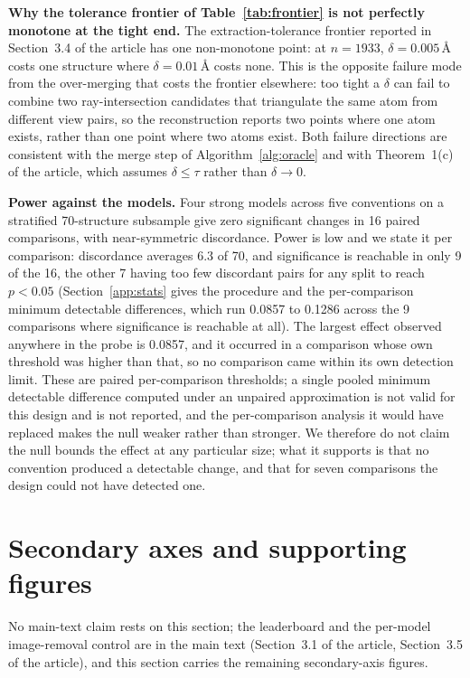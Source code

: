 \textbf{Why the tolerance frontier of Table~\ref{tab:frontier} is not perfectly monotone at the tight end.}
The extraction-tolerance frontier reported in Section~3.4 of the article has one non-monotone point: at
$n=1933$, $\delta = 0.005$\,\AA{} costs one structure where $\delta = 0.01$\,\AA{} costs none. This is the
opposite failure mode from the over-merging that costs the frontier elsewhere: too tight a $\delta$ can fail
to combine two ray-intersection candidates that triangulate the same atom from different view pairs, so the
reconstruction reports two points where one atom exists, rather than one point where two atoms exist. Both
failure directions are consistent with the merge step of Algorithm~\ref{alg:oracle} and with
Theorem~1(c) of the article, which assumes $\delta \le \tau$ rather than $\delta \to 0$.

\textbf{Power against the models.} Four strong models across five conventions on a stratified 70-structure
subsample give zero significant changes in 16 paired comparisons, with near-symmetric discordance. Power
is low and we state it per comparison: discordance averages 6.3 of 70, and significance is reachable in
only 9 of the 16, the other 7 having too few discordant pairs for any split to reach $p<0.05$
(Section~\ref{app:stats} gives the procedure and the per-comparison minimum detectable differences, which
run 0.0857 to 0.1286 across the 9 comparisons where significance is reachable at all). The largest effect
observed anywhere in the probe is 0.0857, and it occurred in a comparison whose own threshold was higher
than that, so no comparison came within its own detection limit. These are paired per-comparison
thresholds; a single pooled minimum detectable difference computed under an unpaired approximation is not
valid for this design and is not reported, and the per-comparison analysis it would have replaced makes the
null weaker rather than stronger. We therefore do not claim the null bounds
the effect at any particular size; what it supports is that no convention produced a detectable change,
and that for seven comparisons the design could not have detected one.

\section{Secondary axes and supporting figures}
\label{app:secondary}
No main-text claim rests on this section; the leaderboard and the per-model image-removal control are in the
main text (Section~3.1 of the article, Section~3.5 of the article), and this section carries the remaining
secondary-axis figures.

